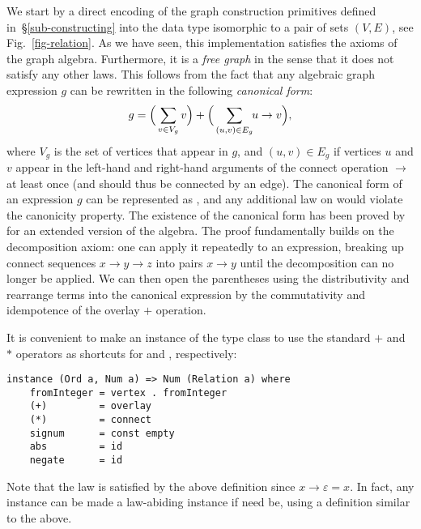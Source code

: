 We start by a direct encoding of the graph construction primitives defined
in~\S\ref{sub-constructing} into the  data type isomorphic
to a pair of sets $(V,E)$, see Fig.~\ref{fig-relation}. As we have seen,
this implementation satisfies the axioms of the graph algebra. Furthermore, it
is a \emph{free graph} in the sense that it does not satisfy any other laws.
This follows from the fact that any algebraic graph expression $g$ can be
rewritten in the following \emph{canonical form}:
\[
g = \Big(\sum_{v\in V_g} v\Big) + \Big(\sum_{(u,v)\in E_g} \hspace{-1mm} u \rightarrow v\Big),
\]
\vspace{-1mm}
\noindent
where $V_g$ is the set of vertices that appear in $g$, and $(u,v)\in E_g$ if
vertices $u$ and $v$ appear in the left-hand and right-hand arguments of
the connect operation $\rightarrow$ at least once (and should thus be connected
by an edge). The canonical form of an
expression $g$ can be represented as ,
and any additional law on  would violate the canonicity property.
The existence of the canonical form has been proved by~\citet{2014_algebra_mokhov}
for an extended version of the algebra. The proof fundamentally builds on the
decomposition axiom: one can apply it repeatedly to an expression, breaking up
connect sequences $x\rightarrow y\rightarrow z$ into pairs $x \rightarrow y$
until the decomposition can no longer be applied. We can then open the parentheses
using the distributivity and rearrange terms into the canonical expression
by the commutativity and idempotence of the overlay $+$ operation.

It is convenient to make  an instance of the  type class
to use the standard $+$ and $*$ operators as shortcuts for  and
, respectively:

\begin{verbatim}
instance (Ord a, Num a) => Num (Relation a) where
    fromInteger = vertex . fromInteger
    (+)         = overlay
    (*)         = connect
    signum      = const empty
    abs         = id
    negate      = id
\end{verbatim}

\noindent
Note that the  law  is satisfied by the above
definition since $x \rightarrow \varepsilon = x$. In fact, any  instance
can be made a law-abiding  instance if need be, using a definition similar to the above.

